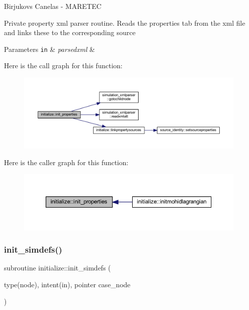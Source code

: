 Birjukovs Canelas -\/ M\+A\+R\+E\+T\+EC 

Private property xml parser routine. Reads the properties tab from the xml file and links these to the corresponding source 
\begin{DoxyParams}[1]{Parameters}
\mbox{\tt in}  & {\em parsedxml} & \\
\hline
\end{DoxyParams}
Here is the call graph for this function\+:\nopagebreak
\begin{figure}[H]
\begin{center}
\leavevmode
\includegraphics[width=350pt]{namespaceinitialize_a4640ad15e29b88467ec842f274f64b62_cgraph}
\end{center}
\end{figure}
Here is the caller graph for this function\+:\nopagebreak
\begin{figure}[H]
\begin{center}
\leavevmode
\includegraphics[width=350pt]{namespaceinitialize_a4640ad15e29b88467ec842f274f64b62_icgraph}
\end{center}
\end{figure}
\mbox{\label{namespaceinitialize_adb972e92da4789506ee6b62b702df2b3}} 
\subsubsection{\texorpdfstring{init\+\_\+simdefs()}{init\_simdefs()}}
{\footnotesize\ttfamily subroutine initialize\+::init\+\_\+simdefs (\begin{DoxyParamCaption}\item[{type(node), intent(in), pointer}]{case\+\_\+node }\end{DoxyParamCaption})\hspace{0.3cm}{\ttfamily [private]}}



